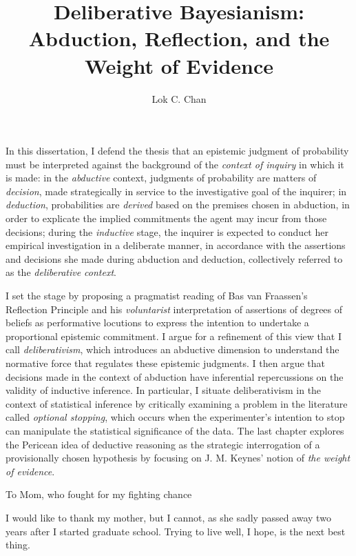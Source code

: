 \documentclass[PhD]{dukethesis2006}
\author{Lok C. Chan}
\title{Deliberative Bayesianism:\\Abduction, Reflection, and the Weight of Evidence}
\newenvironment{dedication}
  {\clearpage           %
   \thispagestyle{empty}%
   \vspace*{\stretch{1}}%
   \itshape             %
   \raggedleft          %
  }
  {\par %
   \vspace{\stretch{3}} %
   \clearpage           %
  }
\begin{document}
\maketitle

\makeabstract
\Copyright
\abstract
In this dissertation, I defend the thesis that an epistemic judgment of
probability must be interpreted against the background of the
\emph{context of inquiry} in which it is made: in the \emph{abductive} context,
judgments of probability are matters of \emph{decision}, made
strategically in service to the investigative goal of the inquirer; in
\emph{deduction}, probabilities are \emph{derived} based on the
premises chosen in abduction, in order to explicate the implied
commitments the agent may incur from those decisions; during the
\emph{inductive} stage, the inquirer is expected to conduct her empirical
investigation in a deliberate manner, in accordance with the assertions and
decisions she made during abduction and deduction, collectively referred
to as the \emph{deliberative context}.

I set the stage by proposing a pragmatist reading of Bas van Fraassen's Reflection Principle and his \emph{voluntarist} interpretation of assertions of degrees of beliefs as performative locutions to express the intention to undertake a proportional epistemic commitment. I argue for a refinement of this view that I call \emph{deliberativism}, which introduces an abductive dimension to understand the normative force that regulates these epistemic judgments. I then argue that decisions made in the context of abduction have inferential repercussions on the validity of inductive inference. In particular, I situate deliberativism in the context of statistical inference by critically examining a problem in the literature called \emph{optional stopping}, which occurs when the experimenter's intention to stop can manipulate the statistical significance of the data. The last chapter explores the Pericean idea of deductive reasoning as the strategic interrogation of a provisionally chosen hypothesis by focusing on J. M. Keynes' notion of \emph{the weight of evidence}.


\begin{dedication}
	To Mom, who fought for my fighting chance
	\end{dedication}

\singlespacing
\tableofcontents
\listoffigures
\listoftables
\doublespacing

\acknowledgements

I would like to thank my mother, but I cannot, as she sadly passed away two years after I started graduate school. Trying to live well, I hope, is the next best thing.
\end{document}
